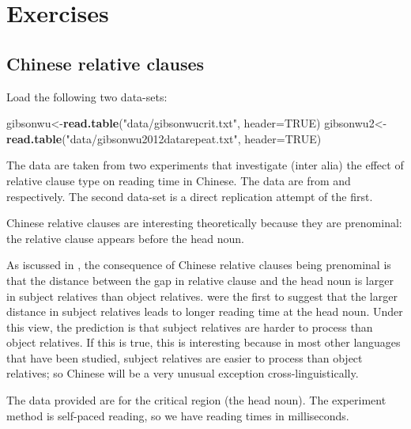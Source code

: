\documentclass[12pt,]{krantz}
\newenvironment{Shaded}{\begin{snugshade}}{\end{snugshade}}
\newcommand{\DataTypeTok}[1]{\textcolor[rgb]{0.13,0.29,0.53}{#1}}
\newcommand{\KeywordTok}[1]{\textcolor[rgb]{0.13,0.29,0.53}{\textbf{#1}}}
\newcommand{\NormalTok}[1]{#1}
\newcommand{\OtherTok}[1]{\textcolor[rgb]{0.56,0.35,0.01}{#1}}
\newcommand{\StringTok}[1]{\textcolor[rgb]{0.31,0.60,0.02}{#1}}
\begin{document}
\hypertarget{sec:HypTestExercises}{%
\section{Exercises}\label{sec:HypTestExercises}}

\hypertarget{sec:HypTestExercisesChinese}{%
\subsection{Chinese relative clauses}\label{sec:HypTestExercisesChinese}}

Load the following two data-sets:

\begin{Shaded}
\begin{Highlighting}[]
\NormalTok{gibsonwu<-}\KeywordTok{read.table}\NormalTok{(}\StringTok{"data/gibsonwucrit.txt"}\NormalTok{,}
                     \DataTypeTok{header=}\OtherTok{TRUE}\NormalTok{)}
\NormalTok{gibsonwu2<-}\KeywordTok{read.table}\NormalTok{(}\StringTok{"data/gibsonwu2012datarepeat.txt"}\NormalTok{,}
                      \DataTypeTok{header=}\OtherTok{TRUE}\NormalTok{)}
\end{Highlighting}
\end{Shaded}

The data are taken from two experiments that investigate (inter alia) the effect of relative clause type on reading time in Chinese. The data are from \citet{gibsonwu} and \citet{VasishthetalPLoSOne2013} respectively. The second data-set is a direct replication attempt of the first.

Chinese relative clauses are interesting theoretically because they are prenominal: the relative clause appears before the head noun.

As iscussed in \citet{gibsonwu}, the consequence of Chinese relative clauses being prenominal is that the distance between the gap in relative clause and the head noun is larger in subject relatives than object relatives. \citet{hsiao03} were the first to suggest that the larger distance in subject relatives leads to longer reading time at the head noun. Under this view, the prediction is that subject relatives are harder to process than object relatives. If this is true, this is interesting because in most other languages that have been studied, subject relatives are easier to process than object relatives; so Chinese will be a very unusual exception cross-linguistically.

The data provided are for the critical region (the head noun). The experiment method is self-paced reading, so we have reading times in milliseconds.
\end{document}
